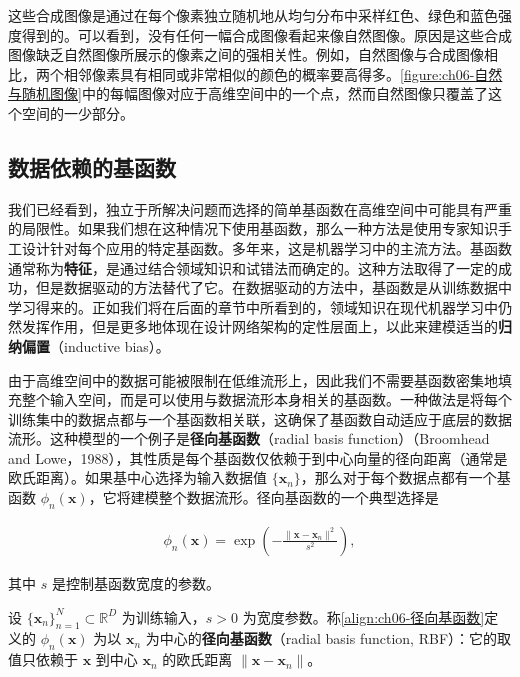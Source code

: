 \documentclass[../../main.tex]{subfiles}
\begin{document}
这些合成图像是通过在每个像素独立随机地从均匀分布中采样红色、绿色和蓝色强度得到的。可以看到，没有任何一幅合成图像看起来像自然图像。原因是这些合成图像缺乏自然图像所展示的像素之间的强相关性。例如，自然图像与合成图像相比，两个相邻像素具有相同或非常相似的颜色的概率要高得多。\cref{figure:ch06-自然与随机图像}中的每幅图像对应于高维空间中的一个点，然而自然图像只覆盖了这个空间的一少部分。

\subsection{数据依赖的基函数}\label{subsection:ch06-数据依赖的基函数}

我们已经看到，独立于所解决问题而选择的简单基函数在高维空间中可能具有严重的局限性。如果我们想在这种情况下使用基函数，那么一种方法是使用专家知识手工设计针对每个应用的特定基函数。多年来，这是机器学习中的主流方法。基函数通常称为\textbf{特征}，是通过结合领域知识和试错法而确定的。这种方法取得了一定的成功，但是数据驱动的方法替代了它。在数据驱动的方法中，基函数是从训练数据中学习得来的。正如我们将在后面的章节中所看到的，领域知识在现代机器学习中仍然发挥作用，但是更多地体现在设计网络架构的定性层面上，以此来建模适当的\textbf{归纳偏置}（inductive bias）。

由于高维空间中的数据可能被限制在低维流形上，因此我们不需要基函数密集地填充整个输入空间，而是可以使用与数据流形本身相关的基函数。一种做法是将每个训练集中的数据点都与一个基函数相关联，这确保了基函数自动适应于底层的数据流形。这种模型的一个例子是\textbf{径向基函数}（radial basis function）（Broomhead and Lowe，1988），其性质是每个基函数仅依赖于到中心向量的径向距离（通常是欧氏距离）。如果基中心选择为输入数据值 $\{\boldsymbol{x}_n\}$，那么对于每个数据点都有一个基函数 $\phi_n(\boldsymbol{x})$，它将建模整个数据流形。径向基函数的一个典型选择是

\begin{align}
\phi_n(\boldsymbol{x})=\exp\!\left(-\frac{\|\boldsymbol{x}-\boldsymbol{x}_n\|^{2}}{s^{2}}\right),
\label{align:ch06-径向基函数}
\end{align}

其中 $s$ 是控制基函数宽度的参数。

\begin{definition}[径向基函数]\label{definition:ch06-径向基函数}
设 $\{\boldsymbol{x}_n\}_{n=1}^{N}\subset\mathbb{R}^{D}$ 为训练输入，$s>0$ 为宽度参数。称\eqref{align:ch06-径向基函数}定义的 $\phi_n(\boldsymbol{x})$ 为以 $\boldsymbol{x}_n$ 为中心的\textbf{径向基函数}（radial basis function, RBF）：它的取值只依赖于 $\boldsymbol{x}$ 到中心 $\boldsymbol{x}_n$ 的欧氏距离 $\|\boldsymbol{x}-\boldsymbol{x}_n\|$。
\end{definition}
\end{document}
